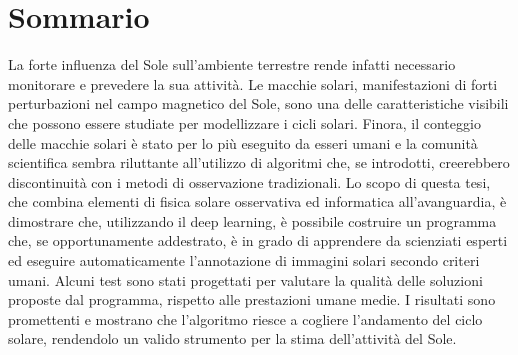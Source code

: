 \newpage
\chapter*{Sommario}




\noindent La forte influenza del Sole sull'ambiente terrestre rende infatti necessario monitorare e prevedere la sua attivit\`{a}. Le macchie solari, manifestazioni di forti perturbazioni nel campo magnetico del Sole, sono una delle caratteristiche visibili che possono essere studiate per modellizzare i cicli solari. Finora, il conteggio delle macchie solari \`{e} stato per lo pi\`{u} eseguito da esseri umani e la comunit\`{a} scientifica sembra riluttante all'utilizzo di algoritmi che, se introdotti, creerebbero discontinuit\`{a} con i metodi di osservazione tradizionali. Lo scopo di questa tesi, che combina elementi di fisica solare osservativa ed informatica all'avanguardia, \`{e} dimostrare che, utilizzando il deep learning, \`{e} possibile costruire un programma che, se opportunamente addestrato, \`{e} in grado di apprendere da scienziati esperti ed eseguire automaticamente l'annotazione di immagini solari secondo criteri umani. Alcuni test sono stati progettati per valutare la qualit\`{a} delle soluzioni proposte dal programma, rispetto alle prestazioni umane medie. I risultati sono promettenti e mostrano che l'algoritmo riesce a cogliere l'andamento del ciclo solare, rendendolo un valido strumento per la stima dell'attivit\`{a} del Sole.
